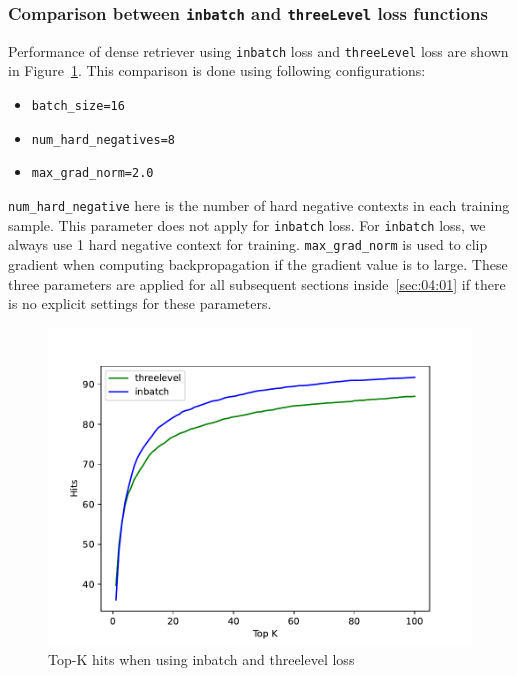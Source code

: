 \documentclass[12pt, sort&compress]{report}
\begin{document}
\subsubsection{Comparison between {\tt inbatch} and {\tt threeLevel} loss functions}
\label{sec:04:01:01}
Performance of dense retriever using {\tt inbatch} loss and {\tt threeLevel} loss are shown in Figure~\ref{fig:12}. This comparison is done using following configurations:
\begin{itemize}
	\item {\tt batch\_size=16}
	\item {\tt num\_hard\_negatives=8}
	\item {\tt max\_grad\_norm=2.0}
\end{itemize}
\par {\tt num\_hard\_negative} here is the number of hard negative contexts in each training sample. This parameter does not apply for {\tt inbatch} loss. For {\tt inbatch} loss, we always use 1 hard negative context for training. {\tt max\_grad\_norm} is used to clip gradient when computing backpropagation if the gradient value is to large. These three parameters are applied for all subsequent sections inside~\ref{sec:04:01} if there is no explicit settings for these parameters.
\begin{figure}[!htbp]
	\centering
	\includegraphics[scale=.7]{images/PDF/experiments/inbatch_threelevel_4-1-1.pdf}
	\caption{Top-K hits when using inbatch and threelevel loss}
	\label{fig:12}
\end{figure}
\end{document}
